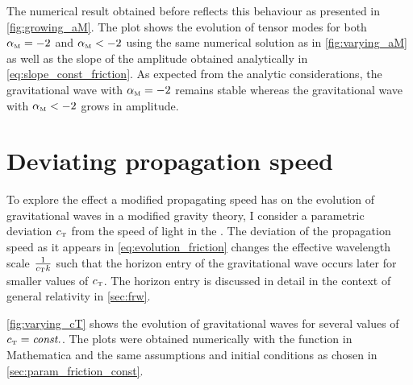 \documentclass[12pt,parskip=half]{scrreprt}
\begin{document}
The numerical result obtained before reflects this behaviour as presented in \autoref{fig:growing_aM}. The plot shows the evolution of tensor modes for both \({\alpha_{\textnormal{\tiny{M}}}} = -2\) and \({\alpha_{\textnormal{\tiny{M}}}} < -2\) using the same numerical solution as in \autoref{fig:varying_aM} as well as the slope of the amplitude obtained analytically in \eqref{eq:slope_const_friction}. As expected from the analytic considerations, the gravitational wave with \({\alpha_{\textnormal{\tiny{M}}}} = -2\) remains stable whereas the gravitational wave with \({\alpha_{\textnormal{\tiny{M}}}} < -2\) grows in amplitude.



\section{Deviating propagation speed}

To explore the effect a modified propagating speed has on the evolution of gravitational waves in a modified gravity theory, I consider a parametric deviation \({c_{\textnormal{\tiny{T}}}}\) from the speed of light in the . The deviation of the propagation speed as it appears in \eqref{eq:evolution_friction} changes the effective wavelength scale \(\frac{1}{{c_{\textnormal{\tiny{T}}}} k}\) such that the horizon entry of the gravitational wave occurs later for smaller values of \({c_{\textnormal{\tiny{T}}}}\). The horizon entry is discussed in detail in the context of general relativity in \autoref{sec:frw}.

\autoref{fig:varying_cT} shows the evolution of gravitational waves for several values of \({c_{\textnormal{\tiny{T}}}}=\textnormal{\textit{const.}}\). The plots were obtained numerically with the  function in Mathematica and the same assumptions and initial conditions as chosen in \autoref{sec:param_friction_const}.

\end{document}
